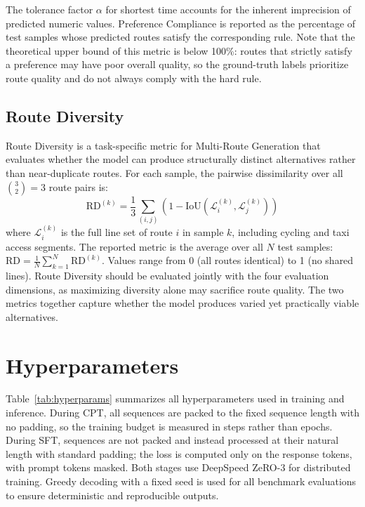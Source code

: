 \documentclass{article}
\begin{document}
\noindent The tolerance factor $\alpha$ for shortest time accounts for the inherent imprecision of predicted numeric values. Preference Compliance is reported as the percentage of test samples whose predicted routes satisfy the corresponding rule. Note that the theoretical upper bound of this metric is below 100\%: routes that strictly satisfy a preference may have poor overall quality, so the ground-truth labels prioritize route quality and do not always comply with the hard rule.

\subsection{Route Diversity}

Route Diversity is a task-specific metric for Multi-Route Generation that evaluates whether the model can produce structurally distinct alternatives rather than near-duplicate routes. For each sample, the pairwise dissimilarity over all $\binom{3}{2} = 3$ route pairs is:
\begin{equation}
\text{RD}^{(k)} = \frac{1}{3}\sum_{(i,j)}(1 - \text{IoU}(\mathcal{L}_i^{(k)}, \mathcal{L}_j^{(k)}))
\end{equation}
where $\mathcal{L}_i^{(k)}$ is the full line set of route $i$ in sample $k$, including cycling and taxi access segments. The reported metric is the average over all $N$ test samples: $\text{RD} = \frac{1}{N}\sum_{k=1}^{N}\text{RD}^{(k)}$. Values range from 0 (all routes identical) to 1 (no shared lines). Route Diversity should be evaluated jointly with the four evaluation dimensions, as maximizing diversity alone may sacrifice route quality. The two metrics together capture whether the model produces varied yet practically viable alternatives.

\section{Hyperparameters}
\label{app:hyperparams}

Table~\ref{tab:hyperparams} summarizes all hyperparameters used in training and inference. During CPT, all sequences are packed to the fixed sequence length with no padding, so the training budget is measured in steps rather than epochs. During SFT, sequences are not packed and instead processed at their natural length with standard padding; the loss is computed only on the response tokens, with prompt tokens masked. Both stages use DeepSpeed ZeRO-3 \cite{rajbhandari2020zero} for distributed training. Greedy decoding with a fixed seed is used for all benchmark evaluations to ensure deterministic and reproducible outputs.
\end{document}
